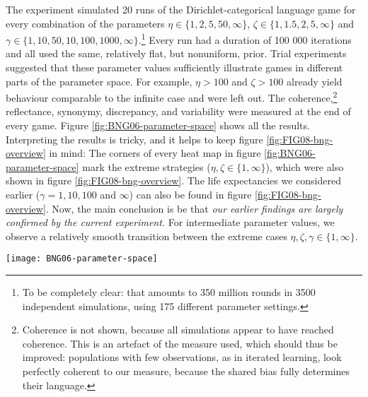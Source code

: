 \documentclass{../src/bcthesispart}
\begin{document}
The experiment simulated 20 runs of the Dirichlet-categorical language game for every combination of the parameters $\eta \in \{1, 2, 5, 50, \infty\}	$, $\zeta \in \{1, 1.5, 2, 5, \infty\}$ and $\gamma \in \{ 1, 10, 50, 10, 100, 1000, \infty \}$.\footnote{%
	To be completely clear: that amounts to 350 million rounds in 3500 independent simulations, using 175 different parameter settings.
	} 
Every run had a duration of 100 000 iterations and all used the same, relatively flat, but nonuniform, prior.
Trial experiments suggested that these parameter values sufficiently illustrate games in different parts of the parameter space.
For example, $\eta>100$ and $\zeta>100$ already yield behaviour comparable to the infinite case and were left out.
The coherence,\footnote{%
	Coherence is not shown, because all simulations appear to have reached coherence.
	This is an artefact of the measure used, which should thus be improved: populations with few observations, as in iterated learning, look perfectly coherent to our measure, because the shared bias fully determines their language.
} reflectance, synonymy, discrepancy, and variability were measured at the end of every game.
Figure \ref{fig:BNG06-parameter-space} shows all the results.
Interpreting the results is tricky, and it helps to keep figure \ref{fig:FIG08-bng-overview} in mind:
The corners of every heat map in figure \ref{fig:BNG06-parameter-space} mark the extreme strategies ($\eta,\zeta\in\{1, \infty\}$), which were also shown in figure \ref{fig:FIG08-bng-overview}.
The life expectancies we considered earlier ($\gamma=1, 10, 100$ and $\infty$) can also be found in figure \ref{fig:FIG08-bng-overview}.
Now, the main conclusion is be that \emph{our earlier findings are largely confirmed by the current experiment.}
For intermediate parameter values, we observe a relatively smooth transition between the extreme cases $\eta,\zeta,\gamma\in\{1,\infty\}$.




\begin{SCfigure}
	\texttt{[image: BNG06-parameter-space]}
	\caption{%
	The behaviour of the Dirichlet-categorical language game across the parameter space $(\gamma,\eta,\zeta)$.
	Rows corresponds to life expectancies ($\gamma$); columns show the coherence, reflectance, synonymy and variability for every strategy $(\eta, \zeta)$.
	See figure \ref{fig:FIG08-bng-overview} for the typical resulting languages in the extreme cases $\gamma,\eta,\zeta \in \{1, \infty\}$.
	\label{fig:BNG06-parameter-space}}
\end{SCfigure}
\end{document}
